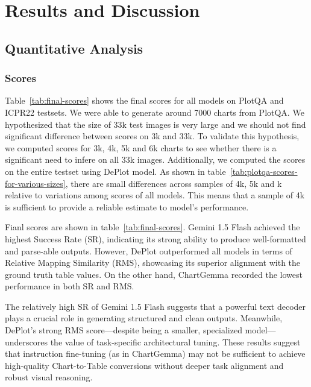 \documentclass[
	letterpaper, %
]{jdf}
\begin{document}
\section{Results and Discussion}\label{sect:results}
\subsection{Quantitative Analysis}\label{ssect:quantitative}
\subsubsection{Scores}\label{ssect:rms}
Table~\ref{tab:final-scores} shows the final scores for all models on PlotQA and ICPR22 testsets.
We were able to generate around 7000 charts from PlotQA.
We hypothesized that the size of 33k test images is very large and we should not find significant difference between scores on 3k and 33k.
To validate this hypothesis, we computed scores for 3k, 4k, 5k and 6k charts to see whether there is a significant need to infere on all 33k images.
Additionally, we computed the scores on the entire testset using DePlot model.
As shown in table~\ref{tab:plotqa-scores-for-various-sizes}, there are small differences across samples of 4k, 5k and k relative to variations among scores of all models.
This means that a sample of 4k is sufficient to provide a reliable estimate to model's performance.



Fianl scores are shown in table~\ref{tab:final-scores}.
Gemini 1.5 Flash achieved the highest Success Rate (SR), indicating its strong ability to produce well-formatted and parse-able outputs.
However, DePlot outperformed all models in terms of Relative Mapping Similarity (RMS), showcasing its superior alignment with the ground truth table values.
On the other hand, ChartGemma recorded the lowest performance in both SR and RMS.

The relatively high SR of Gemini 1.5 Flash suggests that a powerful text decoder plays a crucial role in generating structured and clean outputs.
Meanwhile, DePlot’s strong RMS score—despite being a smaller, specialized model—underscores the value of task-specific architectural tuning.
These results suggest that instruction fine-tuning (as in ChartGemma) may not be sufficient to achieve high-quality Chart-to-Table conversions without deeper task alignment and robust visual reasoning.
\end{document}
